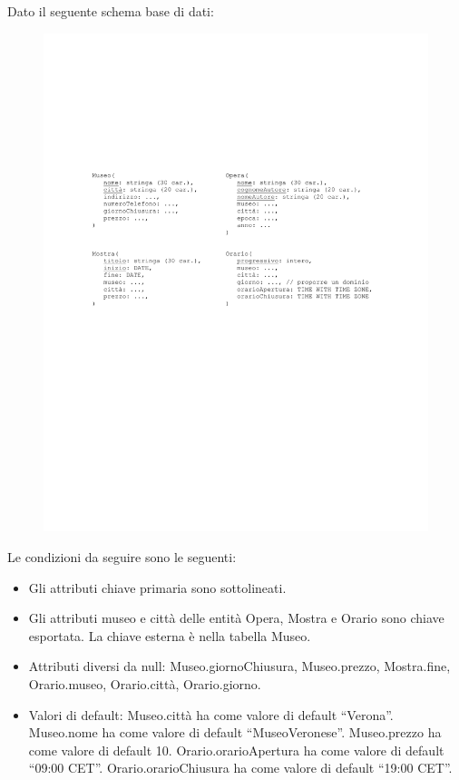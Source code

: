 \documentclass[a4paper]{article}
\newcommand{\dquotes}[1]{``#1''}
\begin{document}
	Dato il seguente schema base di dati:
	\begin{figure}[!htp]
		\centering
		\includegraphics[width=\textwidth]{img/lab/ex1-1.pdf}
	\end{figure}
	
	\noindent
	Le condizioni da seguire sono le seguenti:
	\begin{itemize}
		\item Gli attributi chiave primaria sono sottolineati.
		
		\item Gli attributi \textsf{museo} e \textsf{città} delle entità \textsf{Opera}, \textsf{Mostra} e \textsf{Orario} sono chiave esportata. La chiave esterna è nella tabella \textsf{Museo}.
		
		\item Attributi diversi da null: \textsf{Museo.giornoChiusura, Museo.prezzo, Mostra.fine, Orario.museo, Orario.città, Orario.giorno}.
		
		\item Valori di default: \textsf{Museo.città} ha come valore di default \dquotes{Verona}. \textsf{Museo.nome} ha come valore di default \dquotes{MuseoVeronese}. \textsf{Museo.prezzo} ha come valore di default 10. \textsf{Orario.orarioApertura} ha come valore di default \dquotes{09:00 CET}. \textsf{Orario.orarioChiusura} ha come valore di default \dquotes{19:00 CET}.
	\end{itemize}\newpage
\end{document}
